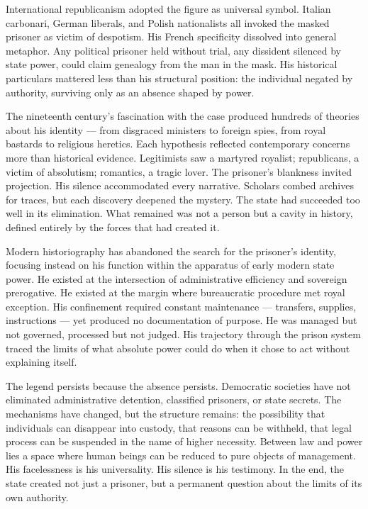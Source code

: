 International republicanism adopted the figure as universal symbol. Italian carbonari, German liberals, and Polish nationalists all invoked the masked prisoner as victim of despotism. His French specificity dissolved into general metaphor. Any political prisoner held without trial, any dissident silenced by state power, could claim genealogy from the man in the mask. His historical particulars mattered less than his structural position: the individual negated by authority, surviving only as an absence shaped by power.

The nineteenth century's fascination with the case produced hundreds of theories about his identity — from disgraced ministers to foreign spies, from royal bastards to religious heretics. Each hypothesis reflected contemporary concerns more than historical evidence. Legitimists saw a martyred royalist; republicans, a victim of absolutism; romantics, a tragic lover. The prisoner's blankness invited projection. His silence accommodated every narrative. Scholars combed archives for traces, but each discovery deepened the mystery. The state had succeeded too well in its elimination. What remained was not a person but a cavity in history, defined entirely by the forces that had created it.

Modern historiography has abandoned the search for the prisoner's identity, focusing instead on his function within the apparatus of early modern state power. He existed at the intersection of administrative efficiency and sovereign prerogative. He existed at the margin where bureaucratic procedure met royal exception. His confinement required constant maintenance — transfers, supplies, instructions — yet produced no documentation of purpose. He was managed but not governed, processed but not judged. His trajectory through the prison system traced the limits of what absolute power could do when it chose to act without explaining itself.

The legend persists because the absence persists. Democratic societies have not eliminated administrative detention, classified prisoners, or state secrets. The mechanisms have changed, but the structure remains: the possibility that individuals can disappear into custody, that reasons can be withheld, that legal process can be suspended in the name of higher necessity. Between law and power lies a space where human beings can be reduced to pure objects of management. His facelessness is his universality. His silence is his testimony. In the end, the state created not just a prisoner, but a permanent question about the limits of its own authority.
